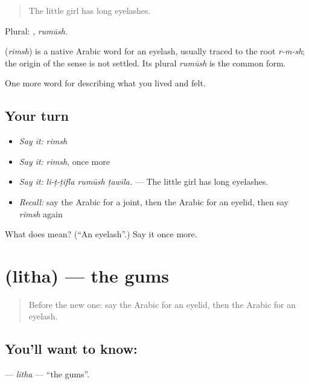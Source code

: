 \begin{quote}
The little girl has long eyelashes.
\end{quote}

Plural: , \emph{rumūsh}.

\begin{cousinweb}
\textbf{} (\emph{rimsh}) is a native Arabic word for an eyelash, usually traced to the root \emph{r-m-sh}; the origin of the sense is not settled. Its plural \emph{rumūsh} is the common form.
\end{cousinweb}

\begin{grammarlens}[title={What you've built}]
One more word for describing what you lived and felt.
\end{grammarlens}

\subsection*{Your turn}
\begin{itemize}
\raggedright
  \item \emph{Say it:} \emph{rimsh}
  \item \emph{Say it:} \emph{rimsh}, once more
  \item \emph{Say it:} \emph{li-ṭ-ṭifla rumūsh ṭawīla.} — The little girl has long eyelashes.
  \item \emph{Recall:} say the Arabic for a joint, then the Arabic for an eyelid, then say \emph{rimsh} again
\end{itemize}

\begin{tcolorbox}[breakable,colback=teal!4,colframe=teal!35!black,title={Before you move on}]
What does  mean? (\textquotedblleft{}An eyelash\textquotedblright{}.) Say it once more.
\end{tcolorbox}
\section[\texorpdfstring{\ar{لثة} (litha)}{لثة (litha)}]{ (litha) — the gums}

\label{lesson:AR-C506-litha}



\begin{quote}
Before the new one: say the Arabic for an eyelid, then the Arabic for an eyelash.
\end{quote}

\subsection*{You'll want to know: }
\textbf{} — \emph{litha} — \textquotedblleft{}the gums\textquotedblright{}.


